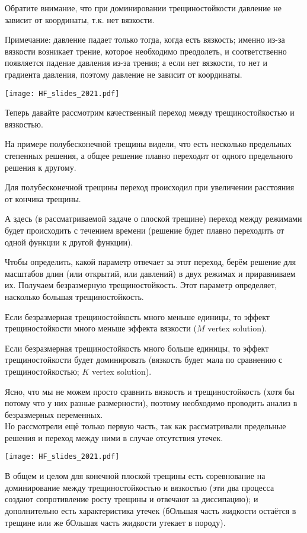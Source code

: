 \documentclass[main.tex]{subfiles}
\begin{document}
Обратите внимание, что при доминировании трещиностойкости давление не зависит от координаты, т.к. нет вязкости.

Примечание: давление падает только тогда, когда есть вязкость;
именно из-за вязкости возникает трение, которое необходимо преодолеть, и соответственно появляется падение давления из-за трения;
а если нет вязкости, то нет и градиента давления, поэтому давление не зависит от координаты.

\texttt{[image: HF\_slides\_2021.pdf]}

Теперь давайте рассмотрим качественный переход между трещиностойкостью и вязкостью.

На примере полубесконечной трещины видели, что есть несколько предельных степенных решения, а общее решение плавно переходит от одного предельного решения к другому.

Для полубесконечной трещины переход происходил при увеличении расстояния от кончика трещины.

А здесь (в рассматриваемой задаче о плоской трещине) переход между режимами будет происходить с течением времени (решение будет плавно переходить от одной функции к другой функции).

Чтобы определить, какой параметр отвечает за этот переход, берём решение для масштабов длин (или открытий, или давлений) в двух режимах и приравниваем их.
Получаем безразмерную трещиностойкость.
Этот параметр определяет, насколько большая трещиностойкость.

Если безразмерная трещиностойкость много меньше единицы, то эффект трещиностойкости много меньше эффекта вязкости ($M$ vertex solution).

Если безразмерная трещиностойкость много больше единицы, то эффект трещиностойкости будет доминировать (вязкость будет мала по сравнению с трещиностойкостью; $K$ vertex solution).

Ясно, что мы не можем просто сравнить вязкость и трещиностойкость (хотя бы потому что у них разные размерности), поэтому необходимо проводить анализ в безразмерных переменных.
\\

Но рассмотрели ещё только первую часть, так как рассматривали предельные решения и переход между ними в случае отсутствия утечек.

\texttt{[image: HF\_slides\_2021.pdf]}

В общем и целом для конечной плоской трещины есть соревнование на доминирование между трещиностойкостью и вязкостью (эти два процесса создают сопротивление росту трещины и отвечают за диссипацию);
и дополнительно есть характеристика утечек (бОльшая часть жидкости остаётся в трещине или же бОльшая часть жидкости утекает в породу).
\end{document}
